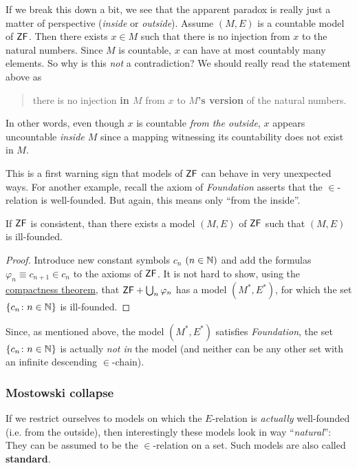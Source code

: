 If we break this down a bit, we see that the apparent paradox is really just a matter of perspective (\textit{inside} or \textit{outside}). Assume $(M,E)$ is a countable model of $\mathsf{ZF}$. Then there exists $x \in M$ such that there is no injection from $x$ to the natural numbers. Since $M$ is countable, $x$ can have at most countably many elements. So why is this \textit{not} a contradiction? We should really read the statement above as

\begin{quote}
there is no injection \textbf{in $M$} from $x$ to \textbf{$M$'s version} of the natural numbers.
\end{quote}

In other words, even though $x$ is countable \textit{from the outside}, $x$ appears uncountable \textit{inside $M$} since a mapping witnessing its countability does not exist in $M$.

This is a first warning sign that models of $\mathsf{ZF}$ can behave in very unexpected ways. For another example, recall the axiom of \textit{Foundation} asserts that the $\in$-relation is well-founded. But again, this means only ``from the inside''.

\begin{proposition}\label{prop-illfounded-zf-model}If $\mathsf{ZF}$ is consistent, than there exists a model $(M,E)$ of $\mathsf{ZF}$ such that $(M,E)$ is ill-founded.

\end{proposition}\begin{proof}Introduce new constant symbols $c_n$ $(n \in \mathbb{N})$ and add the formulas $\varphi_n \equiv c_{n+1} \in c_n$ to the axioms of $\mathsf{ZF}$. It is not hard to show, using the \href{https://en.wikipedia.org/wiki/Compactness\_theorem}{compactness theorem}, that $\mathsf{ZF} + \bigcup_n \varphi_n$ has a model $(M^*, E^*)$, for which the set $\{c_n \colon n \in \mathbb{N}\}$ is ill-founded.

\end{proof}Since, as mentioned above, the model $(M^*,E^*)$ satisfies \textit{Foundation}, the set $\{c_n \colon n \in \mathbb{N}\}$ is actually \textit{not in} the model (and neither can be any other set with an infinite descending $\in$-chain).

\subsubsection{Mostowski collapse}

If we restrict ourselves to models on which the $E$-relation is \textit{actually} well-founded (i.e. from the outside), then interestingly these models look in way ``\textit{natural}'': They can be assumed to be the $\in$-relation on a set. Such models are also called \textbf{standard}.

